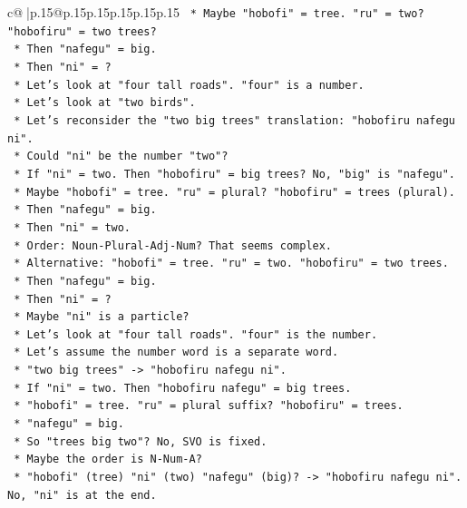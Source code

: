 \documentclass{article}
\begin{document}
{\begin{supertabular}{c@{$\;$}|p{.15\linewidth}@{}p{.15\linewidth}p{.15\linewidth}p{.15\linewidth}p{.15\linewidth}p{.15\linewidth}}
{{{\texttt{        *   Maybe "hobofi" = tree. "ru" = two? "hobofiru" = two trees?} \\
\texttt{        *   Then "nafegu" = big.} \\
\texttt{        *   Then "ni" = ?} \\
\texttt{        *   Let's look at "four tall roads". "four" is a number.} \\
\texttt{        *   Let's look at "two birds".} \\
\texttt{        *   Let's reconsider the "two big trees" translation: "hobofiru nafegu ni".} \\
\texttt{        *   Could "ni" be the number "two"?} \\
\texttt{        *   If "ni" = two. Then "hobofiru" = big trees? No, "big" is "nafegu".} \\
\texttt{        *   Maybe "hobofi" = tree. "ru" = plural? "hobofiru" = trees (plural).} \\
\texttt{        *   Then "nafegu" = big.} \\
\texttt{        *   Then "ni" = two.} \\
\texttt{        *   Order: Noun{-}Plural{-}Adj{-}Num? That seems complex.} \\
\texttt{        *   Alternative: "hobofi" = tree. "ru" = two. "hobofiru" = two trees.} \\
\texttt{        *   Then "nafegu" = big.} \\
\texttt{        *   Then "ni" = ?} \\
\texttt{        *   Maybe "ni" is a particle?} \\
\texttt{        *   Let's look at "four tall roads". "four" is the number.} \\
\texttt{        *   Let's assume the number word is a separate word.} \\
\texttt{        *   "two big trees" {-}> "hobofiru nafegu ni".} \\
\texttt{        *   If "ni" = two. Then "hobofiru nafegu" = big trees.} \\
\texttt{        *   "hobofi" = tree. "ru" = plural suffix? "hobofiru" = trees.} \\
\texttt{        *   "nafegu" = big.} \\
\texttt{        *   So "trees big two"? No, SVO is fixed.} \\
\texttt{        *   Maybe the order is N{-}Num{-}A?} \\
\texttt{        *   "hobofi" (tree) "ni" (two) "nafegu" (big)? {-}> "hobofiru nafegu ni". No, "ni" is at the end.} \\
}}}
\end{supertabular}}
\end{document}
